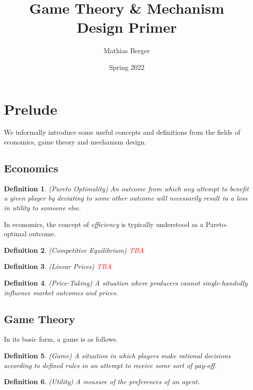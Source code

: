\documentclass{article}
\title{Game Theory \& Mechanism Design Primer}
\author{Mathias Berger}
\date{Spring 2022}
\newtheorem{definition}{Definition}
\begin{document}
\maketitle

\section{Prelude}

We informally introduce some useful concepts and definitions from the fields of economics, game theory and mechanism design.

\subsection{Economics}

\begin{definition}
(Pareto Optimality) An outcome from which any attempt to benefit a given player by deviating to some other outcome will necessarily result in a loss in utility to someone else.
\end{definition}

In economics, the concept of \textit{efficiency} is typically understood as a Pareto-optimal outcome.

\begin{definition}
(Competitive Equilibrium) \textcolor{red}{TBA}
\end{definition}

\begin{definition}
(Linear Prices) \textcolor{red}{TBA}
\end{definition}

\begin{definition}
(Price-Taking) A situation where producers cannot single-handedly influence market outcomes and prices.
\end{definition}  

\subsection{Game Theory}

In its basic form, a game is as follows.

\begin{definition}
(Game) A situation in which players make rational decisions according to defined rules in an attempt to receive some sort of pay-off.
\end{definition}

\begin{definition}
(Utility) A measure of the preferences of an agent.
\end{definition}
\end{document}
